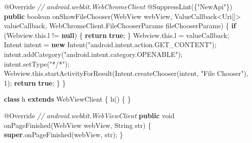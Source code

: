 \documentclass[
]{article}
\newenvironment{Shaded}{}{}
\newcommand{\AttributeTok}[1]{\textcolor[rgb]{0.49,0.56,0.16}{#1}}
\newcommand{\BuiltInTok}[1]{\textcolor[rgb]{0.00,0.50,0.00}{#1}}
\newcommand{\CommentTok}[1]{\textcolor[rgb]{0.38,0.63,0.69}{\textit{#1}}}
\newcommand{\ControlFlowTok}[1]{\textcolor[rgb]{0.00,0.44,0.13}{\textbf{#1}}}
\newcommand{\DataTypeTok}[1]{\textcolor[rgb]{0.56,0.13,0.00}{#1}}
\newcommand{\DecValTok}[1]{\textcolor[rgb]{0.25,0.63,0.44}{#1}}
\newcommand{\FunctionTok}[1]{\textcolor[rgb]{0.02,0.16,0.49}{#1}}
\newcommand{\KeywordTok}[1]{\textcolor[rgb]{0.00,0.44,0.13}{\textbf{#1}}}
\newcommand{\NormalTok}[1]{#1}
\newcommand{\OperatorTok}[1]{\textcolor[rgb]{0.40,0.40,0.40}{#1}}
\newcommand{\StringTok}[1]{\textcolor[rgb]{0.25,0.44,0.63}{#1}}
\begin{document}
\begin{Shaded}
\begin{Highlighting}[]
        \AttributeTok{@Override} \CommentTok{// android.webkit.WebChromeClient}
        \AttributeTok{@SuppressLint}\OperatorTok{(\{}\StringTok{"NewApi"}\OperatorTok{\})}
        \KeywordTok{public} \DataTypeTok{boolean} \FunctionTok{onShowFileChooser}\OperatorTok{(}\NormalTok{WebView webView}\OperatorTok{,}\NormalTok{ ValueCallback}\OperatorTok{\textless{}}\NormalTok{Uri}\OperatorTok{[]\textgreater{}}\NormalTok{ valueCallback}\OperatorTok{,}\NormalTok{ WebChromeClient}\OperatorTok{.}\FunctionTok{FileChooserParams}\NormalTok{ fileChooserParams}\OperatorTok{)} \OperatorTok{\{}
            \ControlFlowTok{if} \OperatorTok{(}\NormalTok{Webview}\OperatorTok{.}\FunctionTok{this}\OperatorTok{.}\FunctionTok{l} \OperatorTok{!=} \KeywordTok{null}\OperatorTok{)} \OperatorTok{\{}
                \ControlFlowTok{return} \KeywordTok{true}\OperatorTok{;}
            \OperatorTok{\}}
\NormalTok{            Webview}\OperatorTok{.}\FunctionTok{this}\OperatorTok{.}\FunctionTok{l} \OperatorTok{=}\NormalTok{ valueCallback}\OperatorTok{;}
\NormalTok{            Intent intent }\OperatorTok{=} \KeywordTok{new} \FunctionTok{Intent}\OperatorTok{(}\StringTok{"android.intent.action.GET\_CONTENT"}\OperatorTok{);}
\NormalTok{            intent}\OperatorTok{.}\FunctionTok{addCategory}\OperatorTok{(}\StringTok{"android.intent.category.OPENABLE"}\OperatorTok{);}
\NormalTok{            intent}\OperatorTok{.}\FunctionTok{setType}\OperatorTok{(}\StringTok{"*/*"}\OperatorTok{);}
\NormalTok{            Webview}\OperatorTok{.}\FunctionTok{this}\OperatorTok{.}\FunctionTok{startActivityForResult}\OperatorTok{(}\NormalTok{Intent}\OperatorTok{.}\FunctionTok{createChooser}\OperatorTok{(}\NormalTok{intent}\OperatorTok{,} \StringTok{"File Chooser"}\OperatorTok{),} \DecValTok{1}\OperatorTok{);}
            \ControlFlowTok{return} \KeywordTok{true}\OperatorTok{;}
        \OperatorTok{\}}
    \OperatorTok{\}}

    \KeywordTok{class}\NormalTok{ h }\KeywordTok{extends}\NormalTok{ WebViewClient }\OperatorTok{\{}
        \FunctionTok{h}\OperatorTok{()} \OperatorTok{\{}
        \OperatorTok{\}}

        \AttributeTok{@Override} \CommentTok{// android.webkit.WebViewClient}
        \KeywordTok{public} \DataTypeTok{void} \FunctionTok{onPageFinished}\OperatorTok{(}\NormalTok{WebView webView}\OperatorTok{,} \BuiltInTok{String}\NormalTok{ str}\OperatorTok{)} \OperatorTok{\{}
            \KeywordTok{super}\OperatorTok{.}\FunctionTok{onPageFinished}\OperatorTok{(}\NormalTok{webView}\OperatorTok{,}\NormalTok{ str}\OperatorTok{);}
        \OperatorTok{\}}


\end{Highlighting}
\end{Shaded}
\end{document}
